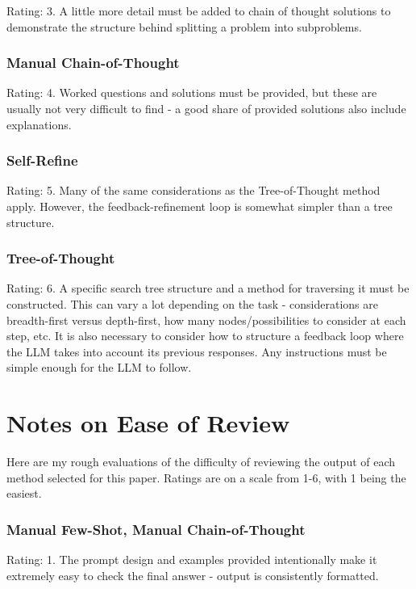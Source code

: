\documentclass[11pt]{article}
\begin{document}
Rating: 3. A little more detail must be added to chain of thought solutions to demonstrate the structure behind splitting a problem into subproblems.

\subsubsection*{Manual Chain-of-Thought}

Rating: 4. Worked questions and solutions must be provided, but these are usually not very difficult to find - a good share of provided solutions also include explanations.

\subsubsection*{Self-Refine}

Rating: 5. Many of the same considerations as the Tree-of-Thought method apply. However, the feedback-refinement loop is somewhat simpler than a tree structure.

\subsubsection*{Tree-of-Thought}

Rating: 6. A specific search tree structure and a method for traversing it must be constructed. This can vary a lot depending on the task - considerations are breadth-first versus depth-first, how many nodes/possibilities to consider at each step, etc. It is also necessary to consider how to structure a feedback loop where the LLM takes into account its previous responses. Any instructions must be simple enough for the LLM to follow.

\clearpage
\newpage

\section{Notes on Ease of Review}
\label{sec:ease_of_review}

Here are my rough evaluations of the difficulty of reviewing the output of each method selected for this paper. Ratings are on a scale from 1-6, with 1 being the easiest.

\subsubsection*{Manual Few-Shot, Manual Chain-of-Thought}

Rating: 1. The prompt design and examples provided intentionally make it extremely easy to check the final answer - output is consistently formatted.
\end{document}
